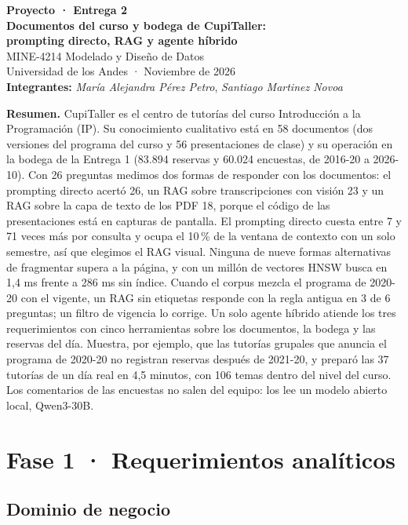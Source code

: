 \documentclass[11pt,letterpaper]{article}
\begin{document}
\begin{center}
{\Large\bfseries Proyecto · Entrega 2\\[2pt] Documentos del curso y bodega de CupiTaller:\\ prompting directo, RAG y agente híbrido}\\[8pt]
MINE-4214 Modelado y Diseño de Datos\\
Universidad de los Andes · Noviembre de 2026\\[6pt]
\textbf{Integrantes:} \emph{María Alejandra Pérez Petro}, \emph{Santiago Martinez Novoa}
\end{center}

\textbf{Resumen.} CupiTaller es el centro de tutorías del curso Introducción a la Programación (IP). Su conocimiento cualitativo está en 58 documentos (dos versiones del programa del curso y 56 presentaciones de clase) y su operación en la bodega de la Entrega 1 (83.894 reservas y 60.024 encuestas, de 2016-20 a 2026-10). Con 26 preguntas medimos dos formas de responder con los documentos: el prompting directo acertó 26, un RAG sobre transcripciones con visión 23 y un RAG sobre la capa de texto de los PDF 18, porque el código de las presentaciones está en capturas de pantalla. El prompting directo cuesta entre 7 y 71 veces más por consulta y ocupa el 10\,\% de la ventana de contexto con un solo semestre, así que elegimos el RAG visual. Ninguna de nueve formas alternativas de fragmentar supera a la página, y con un millón de vectores HNSW busca en 1,4 ms frente a 286 ms sin índice. Cuando el corpus mezcla el programa de 2020-20 con el vigente, un RAG sin etiquetas responde con la regla antigua en 3 de 6 preguntas; un filtro de vigencia lo corrige. Un solo agente híbrido atiende los tres requerimientos con cinco herramientas sobre los documentos, la bodega y las reservas del día. Muestra, por ejemplo, que las tutorías grupales que anuncia el programa de 2020-20 no registran reservas después de 2021-20, y preparó las 37 tutorías de un día real en 4,5 minutos, con 106 temas dentro del nivel del curso. Los comentarios de las encuestas no salen del equipo: los lee un modelo abierto local, Qwen3-30B.

\tableofcontents
\bigskip

\section{Fase 1 · Requerimientos analíticos}

\subsection{Dominio de negocio}
\end{document}
